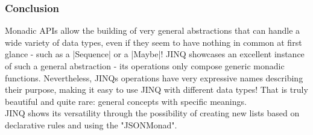 \subsubsection{Conclusion} %
\label{subsub:Conclusion}
Monadic APIs allow the building of very general abstractions that can handle a
wide variety of data types, even if they seem to have nothing in common at
first glance - such as a |Sequence| or a |Maybe|! JINQ showcases an excellent
instance of such a general abstraction - its operations only compose generic
monadic functions. Nevertheless, JINQs operations have very expressive names
describing their purpose, making it easy to use JINQ with different data types!
That is truly beautiful and quite rare: general concepts with specific
meanings.\\ 
JINQ shows its versatility through the possibility of creating new lists based
on declarative rules and using the "JSONMonad".

